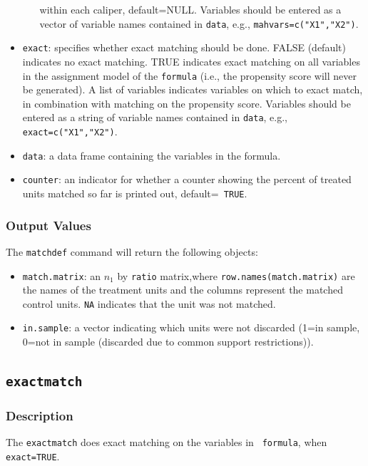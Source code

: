 \documentclass[oneside,letterpaper,titlepage]{article}
\begin{document}
\begin{appendix}
\begin{itemize}
\begin{itemize}
    within each caliper, default=NULL.  Variables should be entered as
    a vector of variable names contained in \texttt{data}, e.g.,
    \texttt{mahvars=c("X1","X2")}.
  \end{itemize}
\item \texttt{exact}: specifies whether exact matching should be done.
  FALSE (default) indicates no exact matching.  TRUE indicates exact
  matching on all variables in the assignment model of the
  \texttt{formula} (i.e., the propensity score will never be
  generated).  A list of variables indicates variables on which to
  exact match, in combination with matching on the propensity score.
  Variables should be entered as a string of variable names contained
  in \texttt{data}, e.g., \texttt{exact=c("X1","X2")}.
\item \texttt{data}: a data frame containing the variables in the
  formula.
\item \texttt{counter}: an indicator for whether a counter showing the
  percent of treated units matched so far is printed out, default={\tt
    TRUE}.
\end{itemize}


\subsubsection{Output Values}
The \texttt{matchdef} command will return the following objects:

\begin{itemize}
\item \texttt{match.matrix}: an $n_1$ by \texttt{ratio} matrix,where
  \texttt{row.names(match.matrix)} are the names of the
  treatment units and the columns represent the matched control units.
  \texttt{NA} indicates that the unit was not matched.
\item \texttt{in.sample}: a vector indicating which units were not discarded
  (1=in sample, 0=not in sample (discarded due to common support
  restrictions)).
\end{itemize}

\subsection{\texttt{exactmatch}}

\subsubsection{Description}
The \texttt{exactmatch} does exact matching on the variables in {\tt
  formula}, when {\tt exact=TRUE}.


\end{appendix}
\end{document}
